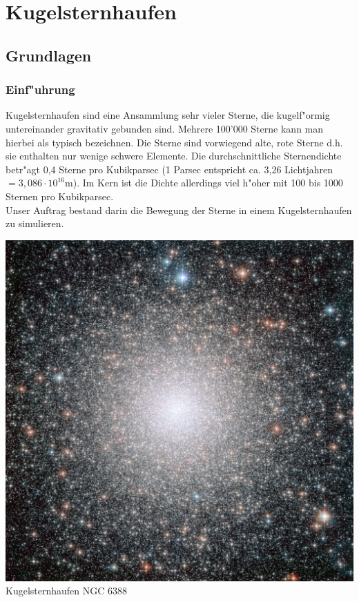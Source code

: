 \chapter{Kugelsternhaufen}
\begin{refsection}

\section{Grundlagen}

	\subsection{Einf"uhrung}
	\begin{minipage}{.65\textwidth}
		Kugelsternhaufen sind eine Ansammlung sehr vieler Sterne, die kugelf"ormig untereinander gravitativ gebunden sind. Mehrere 100'000 Sterne kann man hierbei als typisch bezeichnen. Die Sterne sind vorwiegend alte, rote Sterne d.h. sie enthalten nur wenige schwere Elemente. Die durchschnittliche Sternendichte betr"agt 0,4 Sterne pro Kubikparsec (1 Parsec entspricht ca. 3,26 Lichtjahren $\mathrm{= 3,086 \cdot 10^{16} m}$). Im Kern ist die Dichte allerdings viel h"oher mit 100 bis 1000 Sternen pro Kubikparsec. \\
		Unser Auftrag bestand darin die Bewegung der Sterne in einem Kugelsternhaufen zu simulieren. \cite{kugel:wiki:grundlagen}
	\end{minipage}
	\hspace{.5cm}
	\begin{minipage}{.3\textwidth}
		\begin{center}
			\includegraphics[width = \textwidth]{kugel/images/Abbildung1_1.jpg}
			Kugelsternhaufen NGC 6388 \cite{kugel:titelbild}
		\end{center}
	\end{minipage}


\end{refsection}
